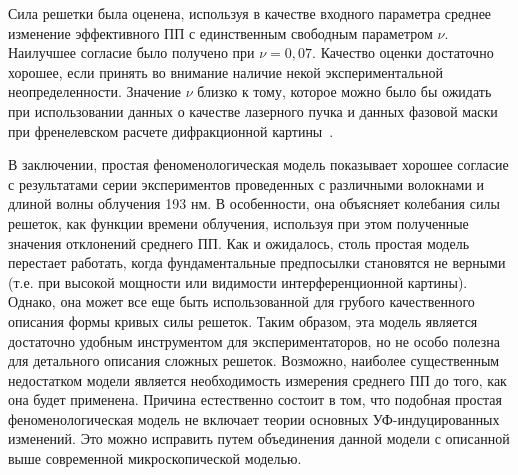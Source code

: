 Сила решетки была оценена, используя в качестве входного параметра среднее изменение эффективного ПП с единственным свободным параметром $\nu$. Наилучшее согласие было получено при $\nu =0,07$. Качество оценки достаточно хорошее, если принять во внимание наличие некой экспериментальной неопределенности. Значение $\nu$ близко к тому, которое можно было бы ожидать при использовании данных о качестве лазерного пучка и данных фазовой маски при френелевском расчете дифракционной картины~\cite{Hubner97}.

В заключении, простая феноменологическая модель  показывает хорошее согласие с результатами серии экспериментов проведенных с различными волокнами и длиной волны облучения 193 нм. В особенности, она объясняет колебания силы решеток, как функции времени облучения, используя при этом полученные значения отклонений среднего ПП. Как и ожидалось, столь простая модель перестает работать, когда фундаментальные предпосылки становятся не верными (т.е. при высокой мощности или видимости интерференционной картины). Однако, она может все еще быть использованной для грубого качественного описания формы кривых силы решеток. Таким образом, эта модель является достаточно удобным инструментом для экспериментаторов, но не особо полезна для детального описания сложных решеток. Возможно, наиболее существенным недостатком модели является необходимость измерения среднего ПП до того, как она будет применена. Причина естественно состоит в том, что подобная простая феноменологическая модель не включает теории основных УФ-индуцированных изменений. Это можно исправить путем объединения данной модели с описанной выше современной микроскопической моделью.

